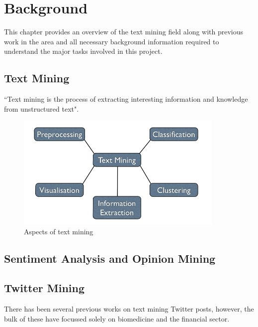 \chapter{Background}
\label{cha:background}
This chapter provides an overview of the text mining field along with previous work in the area and all necessary background information required to understand the major tasks involved in this project.

\section{Text Mining}
\label{sec:textmining}
``Text mining is the process of extracting interesting information and knowledge from unstructured text"\cite{hotho-etal-ldv-2005}.
\begin{figure}
\begin{center}
\includegraphics[width=10cm]{textmining}
\end{center}
\caption{Aspects of text mining}
\label{fig:design}  
\end{figure}

\section[Sentiment Analysis]{Sentiment Analysis and Opinion Mining}

\section{Twitter Mining}
There has been several previous works on text mining Twitter posts, however, the bulk of these have focussed solely on biomedicine and the financial sector.


